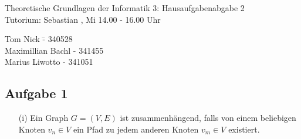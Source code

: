 \documentclass[a4paper,10pt]{article}
\begin{document}
\begin{center}
\Large{Theoretische Grundlagen der Informatik 3: Hausaufgabenabgabe 2} \\
\large{Tutorium: Sebastian , Mi 14.00 - 16.00 Uhr}
\end{center}
\begin{tabbing}
Tom Nick \hspace{2cm}\= - 340528\\
Maximillian Bachl \> - 341455 \\
Marius Liwotto\> -  341051
\end{tabbing}
	\subsection*{Aufgabe 1}

	\begin{enumerate}
	\item[(i)]
%	
%	
%	
%	
%		
%		
Ein Graph $G = (V,E)$ ist zusammenhängend, falls von einem beliebigen Knoten $v_n \in V$ ein Pfad zu jedem anderen Knoten $v_m \in V$ existiert.


\end{enumerate}
\end{document}

